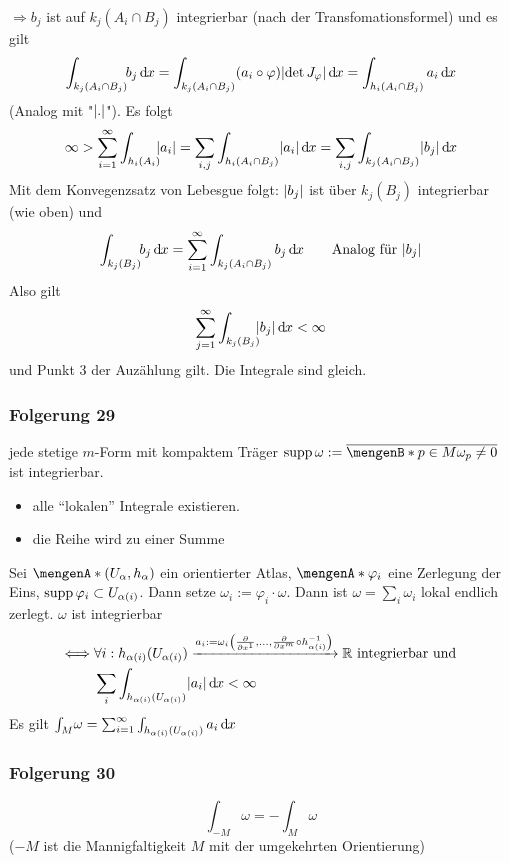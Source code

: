 $\Rightarrow b_j$ ist auf $k_j(A_i \cap B_j)$ integrierbar (nach der Transfomationsformel) und es gilt
\[
	\int_{k_j(A_i \cap B_j)} \! \! b_j  \, \mathd x  = \int_{k_j(A_i \cap B_j)} (a_i \circ \varphi) \abs*{\det J_\varphi}   \, \mathd x  = \int_{h_i(A_i \cap B_j)} 
	a_i  \, \mathd x 
\]
(Analog mit "$\abs*{.}$"). Es folgt 
\[
	\infty > \sum_{i=1}^{\infty} \int_{h_i(A_i)} \! \! \abs*{a_i} = \sum_{i,j} \int_{h_i(A_i \cap B_j)} \abs*{a_i}  \, \mathd x  = 
	\sum_{i,j} \int_{k_j(A_i \cap B_j)} \abs*{b_j}  \, \mathd x   
\]
Mit dem Konvegenzsatz von Lebesgue folgt: $\abs*{b_j}$ ist über $k_j(B_j)$ integrierbar (wie oben) und 
\[
	\int_{k_j(B_j)} \! \! b_j  \, \mathd x = \sum_{i=1}^\infty \int_{k_j(A_i \cap B_j)} b_j  \, \mathd x \tag*{Analog für $\abs*{b_j}$}
\]
Also gilt
\[
	\sum_{j=1}^{\infty} \int_{k_j(B_j)} \! \!  \abs*{b_j}  \, \mathd x < \infty 
\]
und Punkt 3 der Auzählung gilt. Die Integrale sind gleich. \bewende

\subsubsection{Folgerung 29} %
\label{ssub:555}
jede stetige $m$-Form mit kompaktem Träger $\supp \omega := \overline{\set[p \in M]{\omega_p \not= 0} } $ ist integrierbar.
\begin{itemize}
	\item alle \enquote{lokalen} Integrale existieren.
	\item die Reihe wird zu einer Summe \bewende
\end{itemize}
Sei $\set{(U_\alpha, h_\alpha)} $ ein orientierter Atlas, $\set{\varphi_i}$ eine Zerlegung der Eins, $\supp \varphi_i \subset U_{\alpha(i)}$. Dann setze
$\omega_i := \varphi_i \cdot \omega$. Dann ist $\omega = \sum_i \omega_i$ lokal endlich zerlegt. $\omega$ ist integrierbar 
\begin{align*}
	\iff &\forall i : h_{\alpha(i)}(U_{\alpha(i)}) \xrightarrow{a_i := \omega_i \enbrace*{\diff{}{x^1}, \ldots , \diff{}{x^m} \circ h_{\alpha(i)} ^{-1} }} \mathds{R} 
	\text{ integrierbar und } \\
	& \sum_{i} \int_{h_{\alpha(i)}(U_{\alpha(i)})} \abs*{a_i}  \, \mathd x < \infty 
\end{align*}
Es gilt $\int_{M} \! \omega = \sum_{i=1}^{\infty} \int_{h_{\alpha(i)}(U_{\alpha(i)})} a_i  \, \mathd x $

\subsubsection{Folgerung 30} %
\label{ssub:556}
\[
	\int_{-M} \!\omega = - \int_M \! \omega
\]
($-M$ ist die Mannigfaltigkeit $M$ mit der umgekehrten Orientierung)

